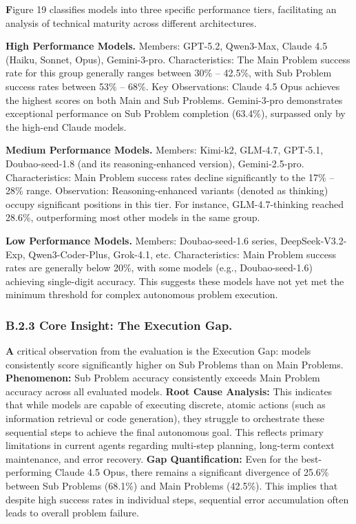 \documentclass{article}
\theoremstyle{plain}
\theoremstyle{definition}
\theoremstyle{remark}
\begin{document}
\vspace{0.5em}
\noindent \textbf Figure 19 classifies models into three specific performance tiers, facilitating an analysis of technical maturity across different architectures.

\noindent \textbf{High Performance Models.} 
Members: GPT-5.2, Qwen3-Max, Claude 4.5 (Haiku, Sonnet, Opus), Gemini-3-pro. 
Characteristics: The Main Problem success rate for this group generally ranges between 30\% -- 42.5\%, with Sub Problem success rates between 53\% -- 68\%. 
Key Observations: Claude 4.5 Opus achieves the highest scores on both Main and Sub Problems. Gemini-3-pro demonstrates exceptional performance on Sub Problem completion (63.4\%), surpassed only by the high-end Claude models.

\noindent \textbf{Medium Performance Models.} 
Members: Kimi-k2, GLM-4.7, GPT-5.1, Doubao-seed-1.8 (and its reasoning-enhanced version), Gemini-2.5-pro. 
Characteristics: Main Problem success rates decline significantly to the 17\% -- 28\% range. 
Observation: Reasoning-enhanced variants (denoted as thinking) occupy significant positions in this tier. For instance, GLM-4.7-thinking reached 28.6\%, outperforming most other models in the same group.

\noindent \textbf{Low Performance Models.} 
Members: Doubao-seed-1.6 series, DeepSeek-V3.2-Exp, Qwen3-Coder-Plus, Grok-4.1, etc. 
Characteristics: Main Problem success rates are generally below 20\%, with some models (e.g., Doubao-seed-1.6) achieving single-digit accuracy. This suggests these models have not yet met the minimum threshold for complex autonomous problem execution.


\subsubsection*{B.2.3 Core Insight: The Execution Gap.}
\vspace{0.5em}
\noindent \textbf A critical observation from the evaluation is the Execution Gap: models consistently score significantly higher on Sub Problems than on Main Problems.
\textbf{Phenomenon:} Sub Problem accuracy consistently exceeds Main Problem accuracy across all evaluated models.
\textbf{Root Cause Analysis:} This indicates that while models are capable of executing discrete, atomic actions (such as information retrieval or code generation), they struggle to orchestrate these sequential steps to achieve the final autonomous goal. This reflects primary limitations in current agents regarding multi-step planning, long-term context maintenance, and error recovery.
\textbf{Gap Quantification:} Even for the best-performing Claude 4.5 Opus, there remains a significant divergence of 25.6\% between Sub Problems (68.1\%) and Main Problems (42.5\%). This implies that despite high success rates in individual steps, sequential error accumulation often leads to overall problem failure.
\end{document}
